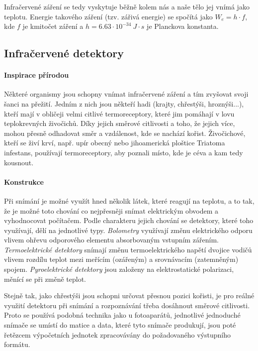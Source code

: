 \documentclass[10pt,a4paper,titlepage]{article}
\begin{document}
  Infračervené záření se tedy vyskytuje běžně kolem nás a naše tělo jej vnímá jako teplotu. Energie
  takového záření (tzv. zářivá energie) se spočítá jako $W_e=h\cdot f$, kde $f$ je kmitočet záření
  a $h=6.63\cdot10^{-34}~J\cdot s $ je Planckova konstanta. \cite{WikipediaInfrared}

  \subsection*{Infračervené detektory}
  \paragraph*{Inspirace přírodou}
  Některé organismy jsou schopny vnímat infračervené záření a tím zvyšovat svoji šanci na přežití.
  Jedním z nich jsou někteří hadi (krajty, chřestýši, hroznýši...), kteří mají v obličeji velmi citlivé
  termoreceptory, které jim pomáhají v lovu teplokrevných živočichů. Díky jejich směrové citlivosti
  a toho, že jejich více, mohou přesně odhadovat směr a vzdálenost, kde se nachází kořist. \cite{SnakeInfrared}
  Živočichové, kteří se živí krví, např. upír obecný nebo jihoamerická ploštice Triatoma infestans,
  používají termoreceptory, aby poznali místo, kde je céva a kam tedy kousnout.

  \paragraph{Konstrukce}
  Při snímání je možné využít hned několik látek, které reagují na teplotu, a to tak, že je možné
  toto chování co nejpřesněji snímat elektrickým obvodem a vyhodnocovat počítačem. Podle
  charakteru jejich chování se detektory, které toho využívají, dělí na jednotlivé typy.
  {\it Bolometry} využívají změnu elektrického odporu vlivem ohřevu odporového elementu
  absorbovaným vstupním zářením. {\it Termoelektrické detektory} snímají změnu termoelektrického
  napětí dvojice vodičů vlivem rozdílu teplot mezi meřícím (ozářeným) a srovnávacím (zatemněným)
  spojem. {\it Pyroelektrické detektory} jsou založeny na elektrostatické polarizaci, měnící se při
  změně teplot. \cite{DetectorsBook}

  Stejně tak, jako chřestýši jsou schopni určovat přesnou pozici kořisti, je pro reálné využití detektoru
  při snímání a rozpoznávání třeba dosáhnout směrové citlivosti. Proto se používá podobná technika jako
  u fotoaparátů, jednotlivé jednoduché snímače se umístí do matice a data, které tyto snímače produkují,
  jsou poté řetězcem výpočetních jednotek zpracovávány do požadovaného výstupního formátu.
  
\end{document}
